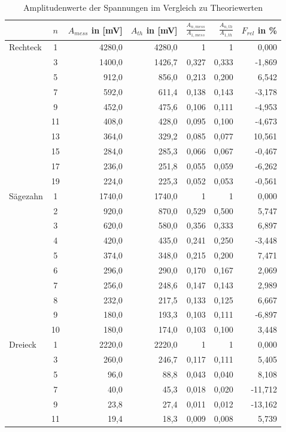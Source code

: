\begin{table}[H]
 \begin{tabular}{l|c|r|r|r|r|r}
 & 	$n$	& $A_{mess}$ in [mV]	& $A_{th}$ in [mV] & $\frac{A_{n,mess}}{A_{1,mess}}$	& $\frac{A_{n,th}}{A_{1,th}}$ & $F_{rel}$ in \%\\
  	\hline
Rechteck &	1&	4280,0&	4280,0&	1&	1 &	0,000\\
	&3&	1400,0&	1426,7	&0,327&	0,333&	-1,869\\
&	5&	912,0&	856,0	&0,213&	0,200&	6,542\\
&	7&	592,0&	611,4&	0,138&	0,143&	-3,178\\
&	9&	452,0&	475,6&	0,106&	0,111&	-4,953\\
&	11&	408,0&	428,0&	0,095&	0,100&	-4,673\\
&	13&	364,0&	329,2&	0,085&	0,077&	10,561\\
&	15&	284,0&	285,3&	0,066&	0,067&	-0,467\\
&	17&	236,0&	251,8&	0,055&	0,059&	-6,262\\
&	19&	224,0&	225,3&	0,052&	0,053&	-0,561 \\
	\hline					
Sägezahn&	1&	1740,0&	1740,0&	1&	1&	0,000\\
&	2&	920,0&	870,0&	0,529&	0,500&	5,747\\
&	3&	620,0&	580,0&	0,356&	0,333&	6,897\\
&	4&	420,0&	435,0&	0,241&	0,250&	-3,448\\
&	5&	374,0&	348,0&	0,215&	0,200&	7,471\\
&	6&	296,0&	290,0&	0,170&	0,167&	2,069\\
&	7&	256,0&	248,6&	0,147&	0,143&	2,989\\
&	8&	232,0&	217,5&	0,133&	0,125&	6,667\\
&	9&	180,0&	193,3&	0,103&	0,111&	-6,897\\
&	10&	180,0&	174,0&	0,103&	0,100&	3,448\\
	\hline					
Dreieck&	1&	2220,0&	2220,0&	1&	1&	0,000\\
&	3&	260,0&	246,7&	0,117&	0,111&	5,405\\
&	5&	96,0&	88,8&	0,043&	0,040&	8,108\\
&	7&	40,0&	45,3&	0,018&	0,020&	-11,712\\
&	9&	23,8&	27,4&	0,011&	0,012&	-13,162\\
&	11&	19,4&	18,3&	0,009&	0,008&	5,739\\
 \end{tabular}
\caption{Amplitudenwerte der Spannungen im Vergleich zu Theoriewerten}
\label{tab_fouriertrafo}
\end{table}

